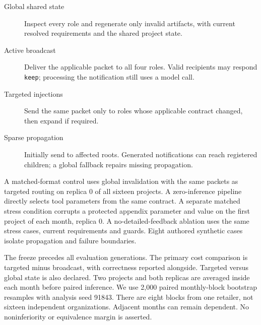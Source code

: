 \documentclass[10pt]{article}
\begin{document}
\begin{description}
\item[Global shared state] Inspect every role and regenerate only invalid artifacts, with current resolved requirements and the shared project state.
\item[Active broadcast] Deliver the applicable packet to all four roles. Valid recipients may respond \texttt{keep}; processing the notification still uses a model call.
\item[Targeted injections] Send the same packet only to roles whose applicable contract changed, then expand if required.
\item[Sparse propagation] Initially send to affected roots. Generated notifications can reach registered children; a global fallback repairs missing propagation.
\end{description}
A matched-format control uses global invalidation with the same packets as targeted routing on replica 0 of all sixteen projects. A zero-inference pipeline directly selects tool parameters from the same contract. A separate matched stress condition corrupts a protected appendix parameter and value on the first project of each month, replica 0. A no-detailed-feedback ablation uses the same stress cases, current requirements and guards. Eight authored synthetic cases isolate propagation and failure boundaries.

The freeze precedes all evaluation generations. The primary cost comparison is targeted minus broadcast, with correctness reported alongside. Targeted versus global state is also declared. Two projects and both replicas are averaged inside each month before paired inference. We use 2,000 paired monthly-block bootstrap resamples with analysis seed 91843. There are eight blocks from one retailer, not sixteen independent organizations. Adjacent months can remain dependent. No noninferiority or equivalence margin is asserted.
\end{document}
